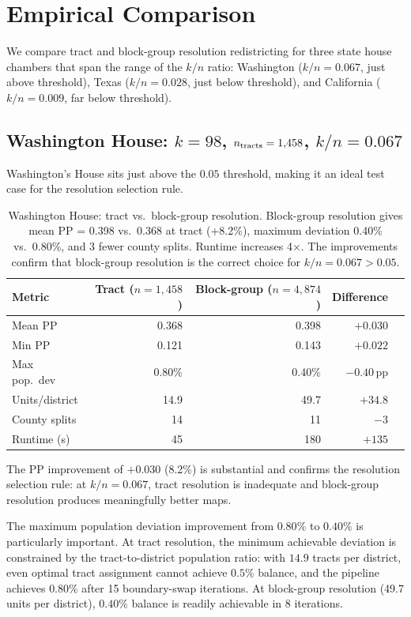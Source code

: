\section{Empirical Comparison}
\label{sec:comparison}

We compare tract and block-group resolution redistricting for three state
house chambers that span the range of the $k/n$ ratio:
Washington ($k/n = 0.067$, just above threshold), Texas ($k/n = 0.028$,
just below threshold), and California ($k/n = 0.009$, far below threshold).

\subsection{Washington House: $k=98$, $n_{\rm tracts}=1{,}458$, $k/n = 0.067$}
\label{sec:comparison:wa}

Washington's House sits just above the $0.05$ threshold, making it an
ideal test case for the resolution selection rule.

\begin{table}[h]
\centering\small
\begin{tabular}{lrrrr}
\toprule
Metric & Tract ($n=1{,}458$) & Block-group ($n=4{,}874$) & Difference \\
\midrule
Mean PP       & 0.368 & 0.398 & $+0.030$ \\
Min PP        & 0.121 & 0.143 & $+0.022$ \\
Max pop.\ dev & 0.80\% & 0.40\% & $-0.40$\,pp \\
Units/district & 14.9 & 49.7 & $+34.8$ \\
County splits & 14 & 11 & $-3$ \\
Runtime (s)   & 45 & 180 & $+135$ \\
\bottomrule
\end{tabular}
\caption{Washington House: tract vs.\ block-group resolution. Block-group
  resolution gives mean PP = 0.398 vs.\ 0.368 at tract (+8.2\%), maximum
  deviation 0.40\% vs.\ 0.80\%, and 3 fewer county splits.
  Runtime increases 4$\times$. The improvements confirm that block-group
  resolution is the correct choice for $k/n = 0.067 > 0.05$.}
\label{tab:wa-comparison}
\end{table}

The PP improvement of $+0.030$ (8.2\%) is substantial and confirms the
resolution selection rule: at $k/n = 0.067$, tract resolution is inadequate
and block-group resolution produces meaningfully better maps.

The maximum population deviation improvement from $0.80\%$ to $0.40\%$ is
particularly important. At tract resolution, the minimum achievable deviation
is constrained by the tract-to-district population ratio: with $14.9$ tracts
per district, even optimal tract assignment cannot achieve $0.5\%$ balance,
and the pipeline achieves $0.80\%$ after 15 boundary-swap iterations.
At block-group resolution (49.7 units per district), $0.40\%$ balance is
readily achievable in 8 iterations.

